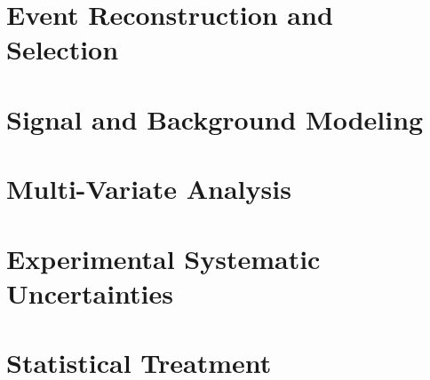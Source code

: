 \documentclass[UKenglish,texlive=2013]{\ATLASLATEXPATH atlasdoc}
\begin{document}
\newpage
\clearpage

\section{Event Reconstruction and Selection}
\label{sec:evtsel}


\section{Signal and Background Modeling}
\label{sec:sigbkgmodel}


\section{Multi-Variate Analysis}
\label{sec:mva}



\section{Experimental Systematic Uncertainties}
\label{sec:sys}


\newpage

\section{Statistical Treatment}
\label{sec:fit}

\end{document}
